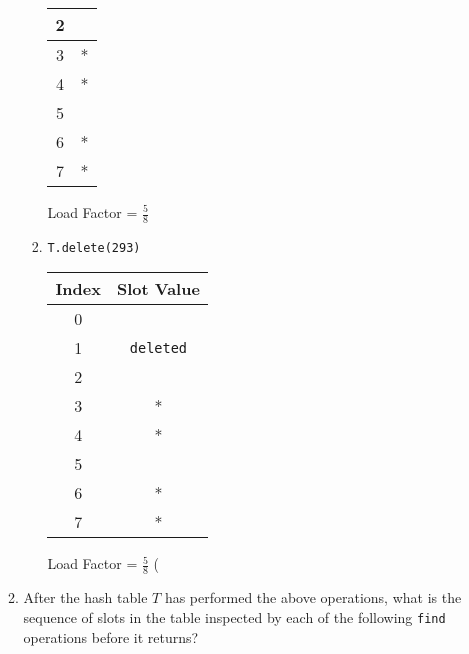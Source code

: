 \documentclass[11pt]{article}
\begin{document}
\begin{enumerate}
\begin{enumerate}
\begin{enumerate}
\begin{center}
\begin{tabular}{|c | c|}
2 & \\
\hline
3 & *\\
\hline
4 & *\\
\hline
5 & \\
\hline
6 & *\\
\hline
7 & *\\
\hline
\end{tabular}
\end{center}
Load Factor = $\frac{5}{8}$
\\
\item
\begin{verbatim}
T.delete(293)
\end{verbatim}
\begin{center}
\begin{tabular}{|c | c|}
\hline
Index & Slot Value\\
\hline
0 & \\
\hline
1 & \texttt{deleted}\\
\hline
2 & \\
\hline
3 & *\\
\hline
4 & *\\
\hline
5 & \\
\hline
6 & *\\
\hline
7 & *\\
\hline
\end{tabular}
\end{center}
Load Factor = $\frac{5}{8}$ (
\\
\end{enumerate}

\item 
After the hash table $T$ has performed the above operations, what is the
sequence of slots in the table inspected by each of the following
\texttt{find} operations before it returns?

\begin{enumerate}



\end{enumerate}
\end{enumerate}
\end{enumerate}
\end{document}
